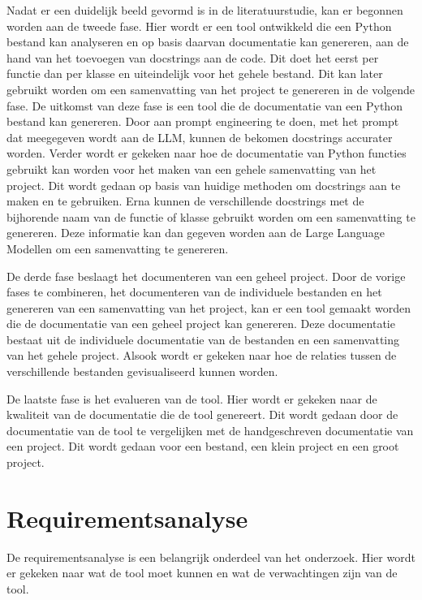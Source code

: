 Nadat er een duidelijk beeld gevormd is in de literatuurstudie, kan er begonnen worden aan de tweede fase.
Hier wordt er een tool ontwikkeld die een Python bestand kan analyseren en op basis daarvan documentatie kan genereren, aan de hand van het toevoegen van docstrings aan de code.
Dit doet het eerst per functie dan per klasse en uiteindelijk voor het gehele bestand. Dit kan later gebruikt worden om een samenvatting van het project te genereren in de volgende fase.
De uitkomst van deze fase is een tool die de documentatie van een Python bestand kan genereren. 
Door aan prompt engineering te doen, met het prompt dat meegegeven wordt aan de LLM, kunnen de bekomen docstrings accurater worden.
Verder wordt er gekeken naar hoe de documentatie van Python functies gebruikt kan worden voor het maken van een gehele samenvatting van het project.
Dit wordt gedaan op basis van huidige methoden om docstrings aan te maken en te gebruiken. 
Erna kunnen de verschillende docstrings met de bijhorende naam van de functie of klasse gebruikt worden om een samenvatting te genereren.
Deze informatie kan dan gegeven worden aan de Large Language Modellen om een samenvatting te genereren.

De derde fase beslaagt het documenteren van een geheel project.
Door de vorige fases te combineren, het documenteren van de individuele bestanden en het genereren van een samenvatting van het project, kan er een tool gemaakt worden die de documentatie van een geheel project kan genereren.
Deze documentatie bestaat uit de individuele documentatie van de bestanden en een samenvatting van het gehele project. 
Alsook wordt er gekeken naar hoe de relaties tussen de verschillende bestanden gevisualiseerd kunnen worden.

De laatste fase is het evalueren van de tool.
Hier wordt er gekeken naar de kwaliteit van de documentatie die de tool genereert.
Dit wordt gedaan door de documentatie van de tool te vergelijken met de handgeschreven documentatie van een project.
Dit wordt gedaan voor een bestand, een klein project en een groot project.

\section{Requirementsanalyse}
\label{sec:requirements-analyse}
De requirementsanalyse is een belangrijk onderdeel van het onderzoek. 
Hier wordt er gekeken naar wat de tool moet kunnen en wat de verwachtingen zijn van de tool.

